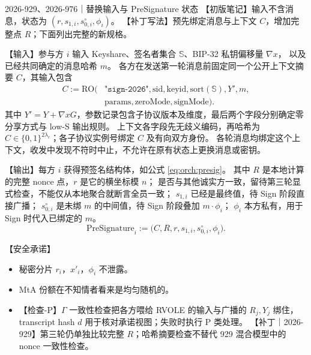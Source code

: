 \begin{patchnote}{2026-929、2026-976｜替换输入与 PreSignature 状态}
【初版笔记】输入不含消息，状态为 $(r,s_{1,i},s_{0,i}^{\circ},\phi_i)$。
【补丁写法】预先绑定消息与上下文 $C$，增加完整点 $R$；下面列出完整的新规格。

【输入】参与方 $i$ 输入 Keyshare、签名者集合 $\mathbb{S}$、BIP-32 私钥偏移量 $\nabla x$，
以及已经共同确定的消息哈希 $m$。
各方在发送第一轮消息前固定同一个公开上下文摘要 $C$，其输入包含
\begin{equation}\label{eq:orch:sign-context}
\begin{aligned}
C:=\mathrm{RO}(&\texttt{"sign-2026"},\mathrm{sid},\mathrm{keyid},
                 \mathrm{sort}(\mathbb S),Y',m,\\
               &\mathrm{params},\mathrm{zeroMode},\mathrm{signMode}).
\end{aligned}
\end{equation}
其中 $Y'=Y+\nabla xG$，参数记录包含子协议版本及维度，最后两个字段分别确定零分享方式与 low-S 输出规则。
上下文各字段先无歧义编码，再哈希为 $C\in\{0,1\}^{2\lambda_c}$；各子协议实例号绑定 $C$ 及有向双方身份。
各轮消息均绑定这个上下文，收发中发现不符时中止，不允许在原有状态上更换消息或密钥。

【输出】每方 $i$ 获得预签名结构体，如公式 \eqref{eq:orch:presig}。
其中 $R$ 是本地计算的完整 nonce 点，$r$ 是它的横坐标模 $n$；
是否与其他诚实方一致，留待第三轮显式检查，不能仅从本地聚合就断言全员一致；
$s_{1,i}$ 已经是最终值，待 Sign 阶段直接广播；
$s_{0,i}^\circ$ 是未绑 $m$ 的中间值，待 Sign 阶段叠加 $m\cdot\phi_i$；
$\phi_i$ 本方私有，用于 Sign 时代入已绑定的 $m$。
\begin{equation}
\label{eq:orch:presig}\tag{presig}
\mathrm{PreSignature}_i := \bigl(C,R,r,s_{1,i},s_{0,i}^\circ,\phi_i\bigr).
\end{equation}
\end{patchnote}

【安全承诺】

\begin{itemize}
\item
  秘密分片 $r_i$，$x'_i$，$\phi_i$ 不泄露。
\item
  MtA 份额在不知情者看来是均匀随机的。
\item
  【检查-P】$\Gamma$ 一致性检查把各方喂给 RVOLE 的输入与广播的 $R_j, Y_j$ 绑住，
  transcript hash $d$ 用于核对承诺视图；失败时执行 P 类处理。
  【补丁｜2026-929】第三轮仍单独比较完整 $R$；哈希摘要检查不替代 929 混合模型中的 nonce 一致性检查。
\end{itemize}

